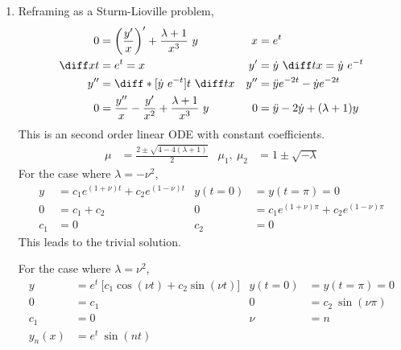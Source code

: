 \begin{enumerate}
    \item Reframing as a Sturm-Lioville problem,
          \begin{align}
              0                             & = \left( \frac{y'}{x} \right)'
              + \frac{\lambda + 1}{x^3} \ y &
              x                             & = e^t                                    \\
              \diff xt                      & = e^t = x                              &
              y'                            & = \dot{y}\ \diff tx = \dot{y}\ e^{-t}    \\
              y''                           & = \diff*{[\dot{y}\ e^{-t}]}{t}
              \ \diff tx                    &
              y''                           & = \ddot{y} e^{-2t} - \dot{y}e^{-2t}      \\
              0                             & = \frac{y''}{x} - \frac{y'}{x^2}
              + \frac{\lambda + 1}{x^3}\ y  &
              0                             & = \ddot{y} - 2\dot{y} + (\lambda + 1)y
          \end{align}
          This is an second order linear ODE with constant coefficients.
          \begin{align}
              \mu           & = \frac{2 \pm \sqrt{4 - 4(\lambda + 1)}}{2} &
              \mu_1,\ \mu_2 & = 1 \pm \sqrt{-\lambda}
          \end{align}
          For the case where $ \lambda = -\nu^2 $,
          \begin{align}
              y      & = c_1 e^{(1+\nu)t} + c_2 e^{(1-\nu)t}    &
              y(t=0) & = y(t=\pi) = 0                             \\
              0      & = c_1 + c_2                              &
              0      & = c_1e^{(1+\nu)\pi} + c_2 e^{(1-\nu)\pi}   \\
              c_1    & = 0                                      &
              c_2    & = 0
          \end{align}
          This leads to the trivial solution.

          For the case where $ \lambda = \nu^2 $,
          \begin{align}
              y      & = e^t\ \Big[ c_1 \cos(\nu t) + c_2 \sin(\nu t) \Big] &
              y(t=0) & = y(t=\pi) = 0                                         \\
              0      & = c_1                                                &
              0      & = c_2\ \sin(\nu \pi)                                   \\
              c_1    & = 0                                                  &
              \nu    & = n                                                    \\
              y_n(x) & = e^t\ \sin(nt)
          \end{align}


\end{enumerate}
